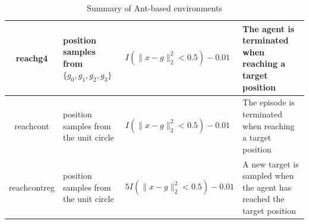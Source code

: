 \begin{table}[!htbp]
\begin{center}
\begin{tabular}{|c|p{3cm}|p{4cm}|p{4cm}|}
reachg4 & position samples from $\{g_0,g_1,g_2,g_3\}$ & $I(\lVert x-g\rVert_2^2<0.5) - 0.01$  & The agent is terminated when reaching a target position\\ \hline
reachcont & position samples from the unit circle & $I(\lVert x-g\rVert_2^2<0.5) - 0.01$  & The episode is terminated when reaching a target position\\ \hline
reachcontreg & position samples from the unit circle & $5I(\lVert x-g\rVert_2^2<0.5) - 0.01$  & A new target is sampled when the agent has reached the target position\\ \hline
\end{tabular}
\end{center}
 \caption{Summary of Ant-based environments}
\end{table}\label{table_ant_envs}
